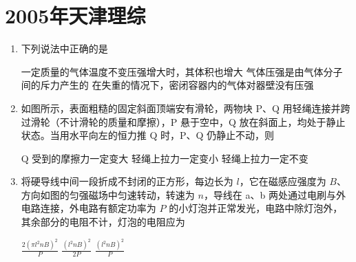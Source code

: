 \documentclass[\gkver]{gaokaozhenti}
\begin{document}
\chapter{2005年天津理综}

\begin{enumerate}
\item
下列说法中正确的是

{一定质量的气体温度不变压强增大时，其体积也增大}
{气体压强是由气体分子间的斥力产生的}
{在失重的情况下，密闭容器内的气体对器壁没有压强}


\item
如图所示，表面粗糙的固定斜面顶端安有滑轮，两物块 P、Q 用轻绳连接并跨过滑轮（不计滑轮的质量和摩擦），P 悬于空中，Q 放在斜面上，均处于静止状态。当用水平向左的恒力推 Q 时，P、Q 仍静止不动，则


{Q 受到的摩擦力一定变大}
{轻绳上拉力一定变小}
{轻绳上拉力一定不变}


\item
将硬导线中间一段折成不封闭的正方形，每边长为 $l$，它在磁感应强度为 $B$、方向如图的匀强磁场中匀速转动，转速为 $n$，导线在 a、b 两处通过电刷与外电路连接，外电路有额定功率为 $P$ 的小灯泡并正常发光，电路中除灯泡外，其余部分的电阻不计，灯泡的电阻应为


{$\frac{2(\pi l^{2}nB)^{2}}{P}$}
{$\frac{(l^{2}nB)^{2}}{2P}$}
{$\frac{(l^{2}nB)^{2}}{P}$}


\end{enumerate}
\end{document}
